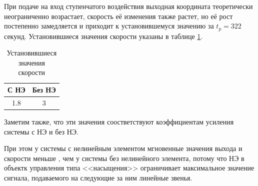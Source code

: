 При подаче на вход ступенчатого воздействия выходная координата теоретически неограниченно возрастает, скорость её изменения также растет, но её рост постепенно замедляется и приходит к установившемуся значению за $t_p=
322$
секунд. Установившиеся значения скорости указаны в таблице \ref{tab:steady_speed}.

\begin{table}[!h] \centering
    \caption{Установившиеся значения скорости} \label{tab:steady_speed}
    \begin{tabular}{|c|c|}
        \hline
        С НЭ & Без НЭ \\ \hline
        1.8 & 3 \\ \hline
    \end{tabular}
\end{table}
Заметим также, что эти значения соостветствуют коэффициентам усиления системы с НЭ и без НЭ.

При этом у системы с нелинейным элементом мгновенные значения выхода и скорости меньше , чем у системы без нелинейного элемента, потому что НЭ в объектк управления типа <<насыщения>> ограничивает максимальное значение сигнала, подаваемого на следующие за ним линейные звенья.
